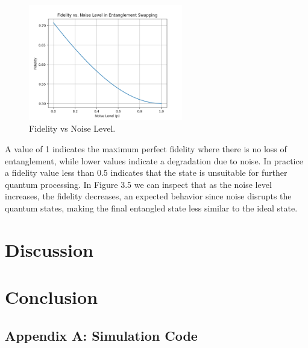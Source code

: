 \documentclass[12pt,a4paper] {report}
\begin{document}
		\begin{figure}[h!]
			\centering
			\includegraphics[width=0.6\textwidth]{repeater/fid_vs_noise.png}
			\caption{Fidelity vs Noise Level.}
			\label{fig:}
		\end{figure}		

		A value of 1 indicates the maximum perfect fidelity where there is no loss of entanglement, 
		while lower values indicate a degradation due to noise.
		In practice a fidelity value less than 0.5 indicates that the state is unsuitable for further quantum processing.
		In Figure 3.5 we can inspect that as the noise level increases, the fidelity decreases,
		an expected behavior since noise disrupts the quantum states,
		making the final entangled state less similar to the ideal state.




	\chapter{Discussion}

	\chapter{Conclusion}





\newpage
\appendix

\section*{Appendix A: Simulation Code }
\end{document}
